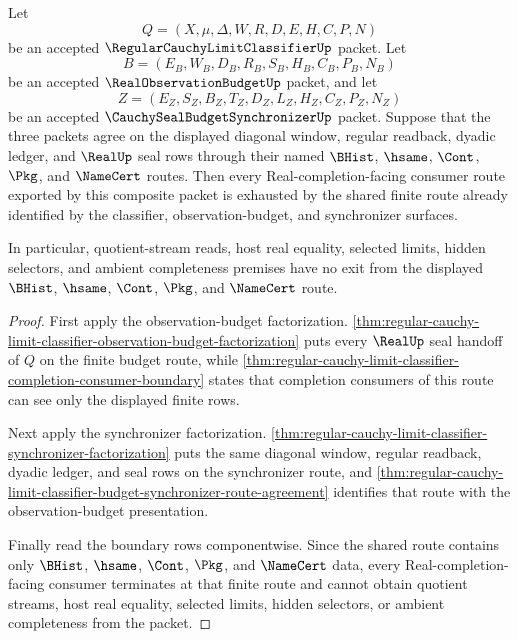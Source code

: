 \begin{theorem}
\label{thm:regular-cauchy-limit-classifier-seal-budget-synchronizer-exhaustion}
Let
$$
Q=(X,\mu,\Delta,W,R,D,E,H,C,P,N)
$$
be an accepted $\RegularCauchyLimitClassifierUp$ packet. Let
$$
B=(E_B,W_B,D_B,R_B,S_B,H_B,C_B,P_B,N_B)
$$
be an accepted $\RealObservationBudgetUp$ packet, and let
$$
Z=(E_Z,S_Z,B_Z,T_Z,D_Z,L_Z,H_Z,C_Z,P_Z,N_Z)
$$
be an accepted $\CauchySealBudgetSynchronizerUp$ packet. Suppose that the three packets agree on the displayed diagonal window, regular readback, dyadic ledger, and $\RealUp$ seal rows through their named $\BHist$, $\hsame$, $\Cont$, $\Pkg$, and $\NameCert$ routes. Then every Real-completion-facing consumer route exported by this composite packet is exhausted by the shared finite route already identified by the classifier, observation-budget, and synchronizer surfaces.

In particular, quotient-stream reads, host real equality, selected limits, hidden selectors, and ambient completeness premises have no exit from the displayed $\BHist$, $\hsame$, $\Cont$, $\Pkg$, and $\NameCert$ route.
\end{theorem}
\begin{proof}
First apply the observation-budget factorization. \autoref{thm:regular-cauchy-limit-classifier-observation-budget-factorization} puts every $\RealUp$ seal handoff of $Q$ on the finite budget route, while \autoref{thm:regular-cauchy-limit-classifier-completion-consumer-boundary} states that completion consumers of this route can see only the displayed finite rows.

Next apply the synchronizer factorization. \autoref{thm:regular-cauchy-limit-classifier-synchronizer-factorization} puts the same diagonal window, regular readback, dyadic ledger, and seal rows on the synchronizer route, and \autoref{thm:regular-cauchy-limit-classifier-budget-synchronizer-route-agreement} identifies that route with the observation-budget presentation.

Finally read the boundary rows componentwise. Since the shared route contains only $\BHist$, $\hsame$, $\Cont$, $\Pkg$, and $\NameCert$ data, every Real-completion-facing consumer terminates at that finite route and cannot obtain quotient streams, host real equality, selected limits, hidden selectors, or ambient completeness from the packet.
\end{proof}

